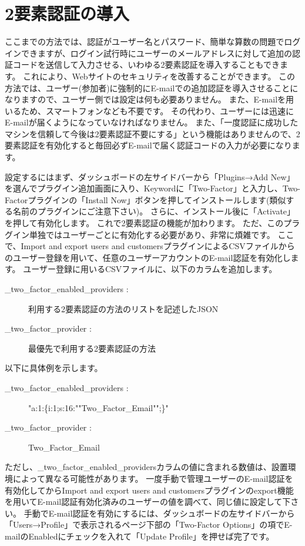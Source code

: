 \documentclass[titlepage,10pt,a4paper,uplatex]{jsbook}
\begin{document}
\section{2要素認証の導入}

ここまでの方法では、認証がユーザー名とパスワード、簡単な算数の問題でログインできますが、ログイン試行時にユーザーのメールアドレスに対して追加の認証コードを送信して入力させる、いわゆる2要素認証を導入することもできます。
これにより、Webサイトのセキュリティを改善することができます。
この方法では、ユーザー(参加者)に強制的にE-mailでの追加認証を導入させることになりますので、ユーザー側では設定は何も必要ありません。
また、E-mailを用いるため、スマートフォンなども不要です。
その代わり、ユーザーには迅速にE-mailが届くようになっていなければなりません。
また、「一度認証に成功したマシンを信頼して今後は2要素認証不要にする」という機能はありませんので、2要素認証を有効化すると毎回必ずE-mailで届く認証コードの入力が必要になります。

設定するにはまず、ダッシュボードの左サイドバーから「Plugins→Add New」を選んでプラグイン追加画面に入り、Keywordに「Two-Factor」と入力し、Two-Factorプラグインの「Install Now」ボタンを押してインストールします(類似する名前のプラグインにご注意下さい)。
さらに、インストール後に「Activate」を押して有効化します。
これで2要素認証の機能が加わります。
ただ、このプラグイン単独ではユーザーごとに有効化する必要があり、非常に煩雑です。
ここで、Import and export users and customersプラグインによるCSVファイルからのユーザー登録を用いて、任意のユーザーアカウントのE-mail認証を有効化します。
ユーザー登録に用いるCSVファイルに、以下のカラムを追加します。

\begin{description}
\item[\_two\_factor\_enabled\_providers : ] 利用する2要素認証の方法のリストを記述したJSON
\item[\_two\_factor\_provider : ] 最優先で利用する2要素認証の方法
\end{description}

以下に具体例を示します。

\begin{description}
\item[\_two\_factor\_enabled\_providers : ] "a:1:\{i:1;s:16:""Two\_Factor\_Email"";\}"
\item[\_two\_factor\_provider : ] Two\_Factor\_Email
\end{description}

ただし、\_two\_factor\_enabled\_providersカラムの値に含まれる数値は、設置環境によって異なる可能性があります。
一度手動で管理ユーザーのE-mail認証を有効化してからImport and export users and customersプラグインのexport機能を用いてE-mail認証有効化済みのユーザーの値を調べて、同じ値に設定して下さい。
手動でE-mail認証を有効にするには、ダッシュボードの左サイドバーから「Users→Profile」で表示されるページ下部の「Two-Factor Options」の項でE-mailのEnabledにチェックを入れて「Update Profile」を押せば完了です。
\end{document}
